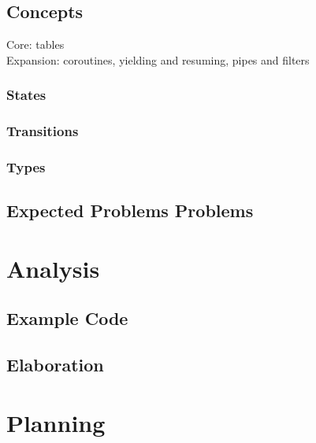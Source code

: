 \documentclass{article}
\begin{document}
\subsection{Concepts}
Core: tables\\
Expansion: coroutines, yielding and resuming, pipes and filters  
\subsubsection{States}
\subsubsection{Transitions}
\subsubsection{Types}
\subsection{ Expected Problems Problems}

\section{Analysis}
\subsection{Example Code}
\subsection{Elaboration}

\newpage
\appendix
\section{Planning}
\end{document}
